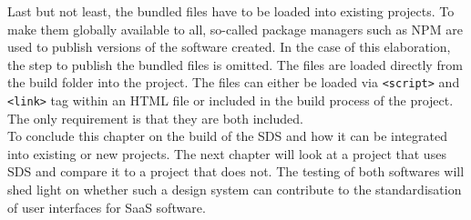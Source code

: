 Last but not least, the bundled files have to be loaded into existing projects. To make them globally available to all, so-called package managers such as NPM are used to publish versions of the software created. In the case of this elaboration, the step to publish the bundled files is omitted. The files are loaded directly from the build folder into the project. The files can either be loaded via \texttt{<script>} and \texttt{<link>} tag within an HTML file or included in the build process of the project. The only requirement is that they are both included. \\
To conclude this chapter on the build of the \ac{SDS} and how it can be integrated into existing or new projects. The next chapter will look at a project that uses \ac{SDS} and compare it to a project that does not. The testing of both softwares will shed light on whether such a design system can contribute to the standardisation of user interfaces for SaaS software. 
